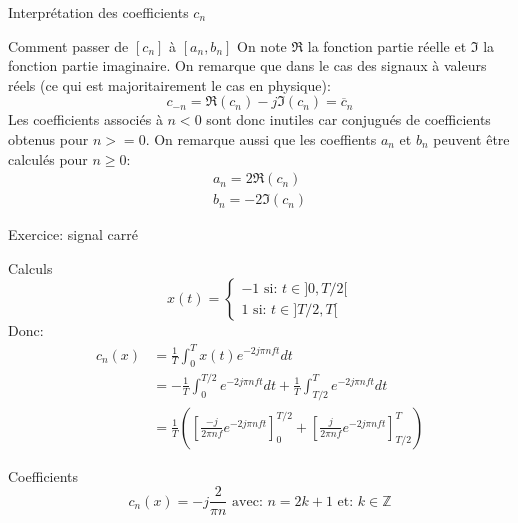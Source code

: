 \documentclass[8pt,a4paper]{beamer}
\begin{document}
\begin{frame}{Interprétation des coefficients $c_n$}
\begin{block}{Comment passer de $[c_n]$ à $[a_n,b_n]$}
On note $\Re$ la fonction partie réelle et $\Im$ la fonction partie imaginaire. On remarque que dans le cas des signaux à valeurs réels (ce qui est majoritairement le cas en physique):
$$
c_{-n} = \Re(c_n)-j\Im(c_n)= \overline c_n
$$
Les coefficients associés à $n<0$ sont donc inutiles car conjugués de coefficients obtenus pour $n>=0$. On remarque aussi que les coeffients $a_n$ et $b_n$ peuvent être calculés pour $n\geq0$:
\begin{align}
a_n = 2\Re(c_n) \nonumber\\
b_n = -2\Im(c_n)\nonumber
\end{align}


\end{block}
\end{frame}

\begin{frame}{Exercice: signal carré}
\begin{block}{Calculs}
$$
x(t) = \left\{
\begin{split}
-1 \mbox{ si: } t \in ]0,T/2[\\
1 \mbox{ si: } t \in ]T/2,T[
\end{split}
\right. 
$$
Donc:
\begin{align}
c_n(x) & = \frac{1}{T}\int_{0}^{T}x(t)e^{-2j\pi n f t}dt \nonumber \\
& = -\frac{1}{T}\int_{0}^{T/2}e^{-2j\pi n f t}dt+\frac{1}{T}\int_{T/2}^{T}e^{-2j\pi n f t}dt \nonumber \\
& = \frac{1}{T}\left(   \left[ \frac{-j}{2\pi nf} e^{-2j\pi n f t} \right]_0^{T/2} + \left[ \frac{j}{2\pi nf} e^{-2j\pi n f t} \right]_{T/2}^T \right)\nonumber
\end{align}
\end{block}
\begin{alertblock}{Coefficients}
$$
c_n(x)=-j\frac{2}{\pi n}\mbox{ avec: } n=2k+1\mbox{ et: }k\in\mathbb{Z}
$$
\end{alertblock}
\end{frame}



%
\end{document}
